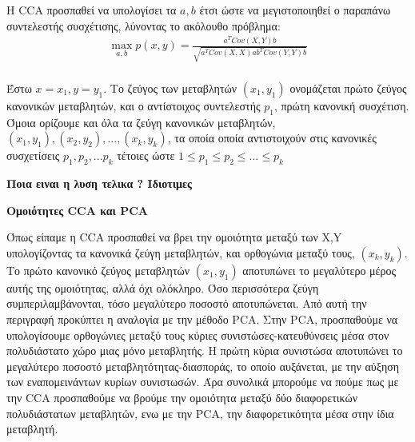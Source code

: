 \documentclass[11pt,a4paper,english,greek,twoside]{../Thesis}
\begin{document}
\par H CCA προσπαθεί να υπολογίσει τα $a, b$ έτσι ώστε να μεγιστοποιηθεί ο παραπάνω συντελεστής συσχέτισης, λύνοντας το ακόλουθο πρόβλημα:
\begin{align}
\max_{a,b}p(x,y)=\frac{a^TCov(X,Y)b}{\sqrt{a^TCov(X,X)ab^TCov(Y,Y)b}} \\
\label{eqCCA2}
\end{align}

\par Έστω $x=x_1,y=y_1$. Το ζεύγος των μεταβλητών $(x_1, y_1)$ ονομάζεται πρώτο ζεύγος κανονικών μεταβλητών, και ο αντίστοιχος συντελεστής $p_1$, πρώτη κανονική συσχέτιση. Όμοια ορίζουμε και όλα τα ζεύγη κανονικών μεταβλητών, $(x_1,y_1),(x_2,y_2),...,(x_k,y_k)$, τα οποία οποία αντιστοιχούν στις κανονικές συσχετίσεις $p_1,p_2,...p_k$ τέτοιες ώστε $1\leq p_1\leq p_2\leq ... \leq p_k$

\textbf{Ποια ειναι η λυση τελικα ? Ιδιοτιμες}

\textbf{Ομοιότητες CCA και PCA} 
\par Όπως είπαμε η CCA προσπαθεί να βρει την ομοιότητα μεταξύ των Χ,Y υπολογίζοντας τα κανονικά ζεύγη μεταβλητών, και ορθογώνια μεταξύ τους, $(x_k,y_k)$. Το πρώτο κανονικό ζεύγος μεταβλητών $(x_1, y_1)$ αποτυπώνει το μεγαλύτερο μέρος αυτής της ομοιότητας, αλλά όχι ολόκληρο. Όσο περισσότερα ζεύγη συμπεριλαμβάνονται, τόσο μεγαλύτερο ποσοστό αποτυπώνεται. Από αυτή την περιγραφή προκύπτει η αναλογία με την μέθοδο PCA. Στην PCA, προσπαθούμε να υπολογίσουμε ορθογώνιες μεταξύ τους κύριες συνιστώσες-κατευθύνσεις μέσα στον πολυδιάστατο χώρο μιας μόνο μεταβλητής. Η πρώτη κύρια συνιστώσα αποτυπώνει το μεγαλύτερο ποσοστό μεταβλητότητας-διασποράς, το οποίο αυξάνεται, με την αύξηση των εναπομεινάντων κυρίων συνιστωσών. Άρα συνολικά μπορούμε να πούμε πως με την CCA προσπαθούμε να βρούμε την ομοιότητα μεταξύ δύο διαφορετικών πολυδιάστατων μεταβλητών, ενω με την PCA, την διαφορετικότητα μέσα στην ίδια μεταβλητή.
\end{document}
